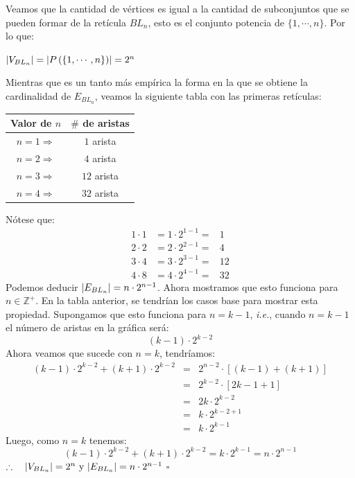 \documentclass{article}
\begin{document}
\begin{enumerate}
\begin{enumerate}
      Veamos que la cantidad de vértices es igual a la
      cantidad de subconjuntos que se pueden formar de
      la retícula $BL_n$, esto es el conjunto potencia
      de $\{1, \dotsm, n\}$. Por lo que:
      \begin{center}
        $\abs{V_{BL_n}} = \abs{P \left(\{1, \dotsm, n\}\right)} = 2^{n}$
      \end{center}
      Mientras que es un tanto más empírica la forma en
      la que se obtiene la cardinalidad de $E_{BL_n}$,
      veamos la siguiente tabla con las primeras retículas:
      \begin{center}
        \begin{tabular}{|c|c|}
          \hline
          Valor de $n$ & $\#$ de aristas \\
          \hline
          $n = 1 \Rightarrow$ & $1$ arista \\
          \hline
          $n = 2 \Rightarrow$ & $4$ arista \\
          \hline
          $n = 3 \Rightarrow$ & $12$ arista \\
          \hline
          $n = 4 \Rightarrow$ & $32$ arista \\
          \hline
        \end{tabular}
      \end{center}
      Nótese que:
      \begin{eqnarray*}
        1 \cdot 1 &= 1 \cdot 2^{1-1} =& 1\\
        2 \cdot 2 &= 2 \cdot 2^{2-1} =& 4\\
        3 \cdot 4 &= 3 \cdot 2^{3-1} =& 12\\
        4 \cdot 8 &= 4 \cdot 2^{4-1} =& 32
      \end{eqnarray*}
      Podemos deducir $\abs{E_{BL_n}} = n \cdot 2^{n-1}$.
      Ahora mostramos que esto funciona para
      $n \in \mathbb{Z}^{+}$. En la tabla anterior, se
      tendrían los casos base para mostrar esta propiedad.
      Supongamos que esto funciona para $n = k -1$,
      \textit{i.e.}, cuando $n = k-1$ el número de aristas
      en la gráfica será:
      \[
      (k -1) \cdot 2^{k -2}
      \]
      Ahora veamos que sucede con $n = k$, tendríamos:
      \begin{eqnarray*}
        (k -1) \cdot 2^{k -2} + (k +1) \cdot 2^{k -2} &=&
        2^{n -2} \cdot [(k -1) + (k +1)]\\
        &=& 2^{k -2} \cdot [2k -1 +1]\\
        &=& 2k \cdot 2^{k -2}\\
        &=& k \cdot 2^{k -2 + 1}\\
        &=& k \cdot 2^{k -1}
      \end{eqnarray*}
      Luego, como $n = k$ tenemos:
      \[
      (k -1) \cdot 2^{k -2} + (k +1) \cdot 2^{k -2} =
      k \cdot 2^{k -1} = n \cdot 2^{n -1}
      \]
      \hspace*{3.4 cm} $\therefore\ \ \ \abs{V_{BL_n}} = 2^n
      \text{ y } |E_{BL_n}| = n \cdot 2^{n -1}$
      \hfill $\square$
      

\end{enumerate}
\end{enumerate}
\end{document}
